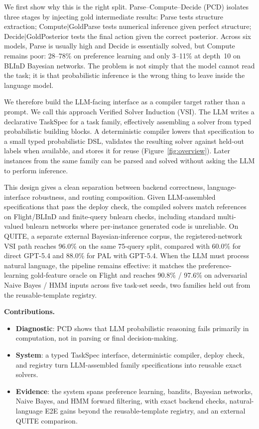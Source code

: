 \documentclass{article}
\newcommand{\taskspec}{TaskSpec}
\begin{document}
We first show why this is the right split.
Parse--Compute--Decide (PCD) isolates three stages by injecting gold intermediate results: Parse tests structure extraction; Compute$\mid$GoldParse tests numerical inference given perfect structure; Decide$\mid$GoldPosterior tests the final action given the correct posterior.
Across six models, Parse is usually high and Decide is essentially solved, but Compute remains poor: 28--78\% on preference learning and only 3--11\% at depth~10 on BLInD Bayesian networks.
The problem is not simply that the model cannot read the task; it is that probabilistic inference is the wrong thing to leave inside the language model.

We therefore build the LLM-facing interface as a compiler target rather than a prompt.
We call this approach Verified Solver Induction (VSI).
The LLM writes a declarative \taskspec{} for a task family, effectively assembling a solver from typed probabilistic building blocks.
A deterministic compiler lowers that specification to a small typed probabilistic DSL, validates the resulting solver against held-out labels when available, and stores it for reuse (Figure~\ref{fig:overview}).
Later instances from the same family can be parsed and solved without asking the LLM to perform inference.

This design gives a clean separation between backend correctness, language-interface robustness, and routing composition.
Given LLM-assembled specifications that pass the deploy check, the compiled solvers match references on Flight/BLInD and finite-query bnlearn checks, including standard multi-valued bnlearn networks where per-instance generated code is unreliable.
On QUITE, a separate external Bayesian-inference corpus, the registered-network VSI path reaches 96.0\% on the same 75-query split, compared with 60.0\% for direct GPT-5.4 and 88.0\% for PAL with GPT-5.4.
When the LLM must process natural language, the pipeline remains effective: it matches the preference-learning gold-feature oracle on Flight and reaches 90.8\% / 97.6\% on adversarial Naive Bayes / HMM inputs across five task-set seeds, two families held out from the reusable-template registry.

\textbf{Contributions.}
\begin{itemize}
    \item \textbf{Diagnostic}: PCD shows that LLM probabilistic reasoning fails primarily in computation, not in parsing or final decision-making.
    \item \textbf{System}: a typed \taskspec{} interface, deterministic compiler, deploy check, and registry turn LLM-assembled family specifications into reusable exact solvers.
    \item \textbf{Evidence}: the system spans preference learning, bandits, Bayesian networks, Naive Bayes, and HMM forward filtering, with exact backend checks, natural-language E2E gains beyond the reusable-template registry, and an external QUITE comparison.
\end{itemize}
\end{document}
